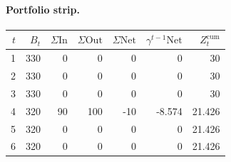 \documentclass[12pt, a4paper]{article}
\begin{document}
\paragraph{Portfolio strip.}
\begin{center}
\begin{tabular}{rrrrrrr}
\toprule
$t$ & $B_t$ & $\Sigma\mathrm{In}$ & $\Sigma\mathrm{Out}$ & $\Sigma\mathrm{Net}$ & $\gamma^{t-1}\mathrm{Net}$ & $Z_t^{\mathrm{cum}}$\\
\midrule
1 & 330 & 0 & 0 & 0 & 0 & 30 \\
2 & 330 & 0 & 0 & 0 & 0 & 30 \\
3 & 330 & 0 & 0 & 0 & 0 & 30 \\
4 & 320 & 90 & 100 & -10 & -8.574 & 21.426 \\
5 & 320 & 0 & 0 & 0 & 0 & 21.426 \\
6 & 320 & 0 & 0 & 0 & 0 & 21.426 \\
\bottomrule
\end{tabular}
\end{center}
\end{document}
